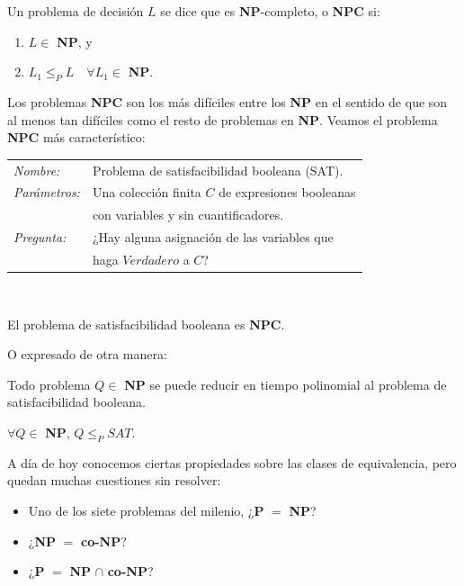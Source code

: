\begin{definition}
	Un problema de decisión $L$ se dice que es \textbf{NP}-completo, o \textbf{NPC} si:
	\begin{enumerate}[label=(\roman*)]
		\item $L \in $ \textbf{NP}, y
		\item $L_1 \leq_P L \quad \forall L_1 \in $ \textbf{NP}.
	\end{enumerate}
\end{definition}

\hfil

Los problemas \textbf{NPC} son los más difíciles entre los \textbf{NP} en el sentido de que son al menos tan difíciles como el resto de problemas en \textbf{NP}. Veamos el problema \textbf{NPC} más característico:

\begin{tabular}{|ll}
	\textit{Nombre:} & Problema de satisfacibilidad booleana (SAT). \\
	\textit{Parámetros:} & Una colección finita $C$ de expresiones booleanas \\
	&  con variables y sin cuantificadores. \\
	\textit{Pregunta:} & ¿Hay alguna asignación de las variables que \\ & haga $Verdadero$ a $C$? \\
\end{tabular}
\\

\begin{theorem}
	El problema de satisfacibilidad booleana es \textbf{NPC}.
\end{theorem}


O expresado de otra manera:

\begin{theorem}
	\label{redNPC:theo}
	Todo problema $Q \in $ \textbf{NP} se puede reducir en tiempo polinomial al problema de satisfacibilidad booleana.
	
	$\forall Q \in $ \textbf{NP}, $Q \leq_P SAT$.
\end{theorem}


\hfil

A día de hoy conocemos ciertas propiedades sobre las clases de equivalencia, pero quedan muchas cuestiones sin resolver:

\begin{itemize}
	\item Uno de los siete problemas del milenio, ¿\textbf{P} $=$ \textbf{NP}?
	\item ¿\textbf{NP} $=$ \textbf{co-NP}?
	\item ¿\textbf{P} $=$ \textbf{NP} $\cap$ \textbf{co-NP}?
\end{itemize}


